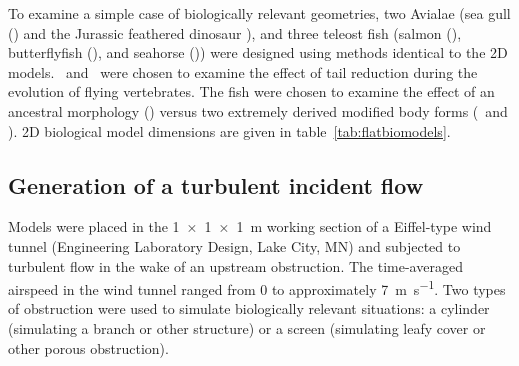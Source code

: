 
To examine a simple case of biologically relevant geometries, two Avialae (sea gull (\Larus)  and the Jurassic feathered dinosaur \Anchiornis), and three teleost fish (salmon (\Oncorhynchus), butterflyfish (\Chaetodon), and seahorse (\Hippocampus)) were designed using methods identical to the 2D models.  \Larus\ and \Anchiornis\ were chosen to examine the effect of tail reduction during the evolution of flying vertebrates.  The fish were chosen to examine the effect of an ancestral morphology (\Oncorhynchus) versus two extremely derived modified body forms (\Chaetodon\ and \Hippocampus). 2D biological model dimensions are given in table~\ref{tab:flatbiomodels}. 


\subsection{Generation of a turbulent incident flow}
Models were placed in the \SI{1x1x1}{\meter} working section of a Eiffel-type wind tunnel (Engineering Laboratory Design, Lake City, MN) and subjected to turbulent flow in the wake of an upstream obstruction. The time-averaged airspeed in the wind tunnel ranged from 0 to approximately \SI{7}{\meter\per\second}.  Two types of obstruction were used to simulate biologically relevant situations: a cylinder (simulating a branch or other structure) or a screen (simulating leafy cover or other porous obstruction).  


